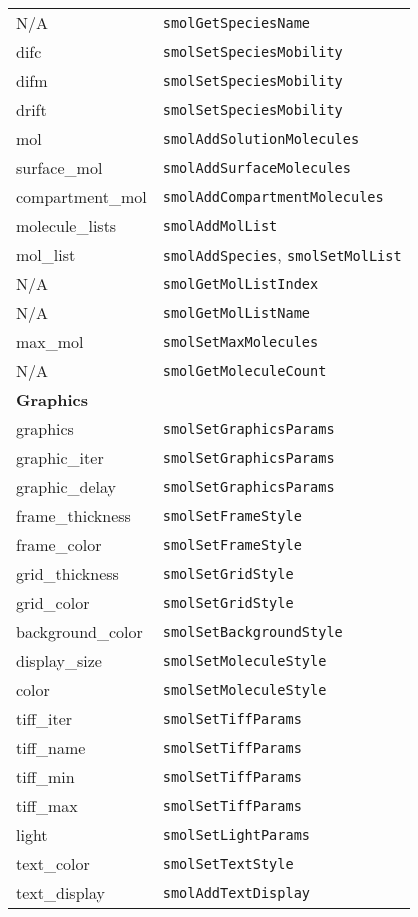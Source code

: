 \documentclass {book}
\begin{document}
\begin{longtable}[c]{ll}
N/A & \texttt{smolGetSpeciesName}\\
difc & \texttt{smolSetSpeciesMobility}\\
difm & \texttt{smolSetSpeciesMobility}\\
drift & \texttt{smolSetSpeciesMobility}\\
mol & \texttt{smolAddSolutionMolecules}\\
surface\_mol & \texttt{smolAddSurfaceMolecules}\\
compartment\_mol & \texttt{smolAddCompartmentMolecules}\\
molecule\_lists & \texttt{smolAddMolList}\\
mol\_list & \texttt{smolAddSpecies}, \texttt{smolSetMolList}\\
N/A & \texttt{smolGetMolListIndex}\\
N/A & \texttt{smolGetMolListName}\\
max\_mol & \texttt{smolSetMaxMolecules}\\
N/A & \texttt{smolGetMoleculeCount}\\
\hline
\multicolumn{2}{l}{\hspace{0.3in}\textbf{Graphics}}\\
\hline
graphics & \texttt{smolSetGraphicsParams}\\
graphic\_iter & \texttt{smolSetGraphicsParams}\\
graphic\_delay & \texttt{smolSetGraphicsParams}\\
frame\_thickness & \texttt{smolSetFrameStyle}\\
frame\_color & \texttt{smolSetFrameStyle}\\
grid\_thickness & \texttt{smolSetGridStyle}\\
grid\_color & \texttt{smolSetGridStyle}\\
background\_color & \texttt{smolSetBackgroundStyle}\\
display\_size & \texttt{smolSetMoleculeStyle}\\
color & \texttt{smolSetMoleculeStyle}\\
tiff\_iter & \texttt{smolSetTiffParams}\\
tiff\_name & \texttt{smolSetTiffParams}\\
tiff\_min & \texttt{smolSetTiffParams}\\
tiff\_max & \texttt{smolSetTiffParams}\\
light & \texttt{smolSetLightParams}\\
text\_color & \texttt{smolSetTextStyle}\\
text\_display & \texttt{smolAddTextDisplay}\\

\end{longtable}
\end{document}
